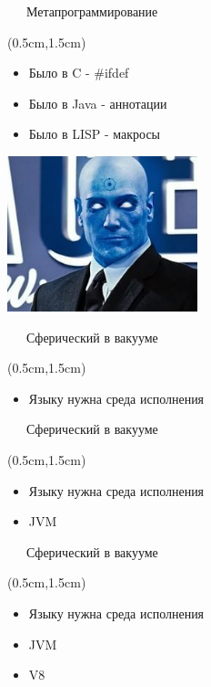 \documentclass[xetex,18pt,aspectratio=43]{beamer}
\begin{document}
\begin{Large}
\begin{frame}{\ \ \ Метапрограммирование}
\begin{textblock*}{\framewidth}(0.5cm,1.5cm)
\begin{itemize}
  \item Было в C - \#ifdef
  \item Было в Java - аннотации
  \item Было в LISP - макросы
\end{itemize}
\begin{minipage}{\textwidth}
  \centering
  \includegraphics[height=4.5cm]{img/megamind}
\end{minipage}
\end{textblock*}
\end{frame}

\begin{frame}{\ \ \ Сферический в вакууме}
\begin{textblock*}{\framewidth}(0.5cm,1.5cm)
\begin{itemize}
  \item Языку нужна среда исполнения
\end{itemize}
\end{textblock*}
\end{frame}

\begin{frame}{\ \ \ Сферический в вакууме}
\begin{textblock*}{\framewidth}(0.5cm,1.5cm)
\begin{itemize}
  \item Языку нужна среда исполнения
  \item JVM
\end{itemize}
\end{textblock*}
\end{frame}

\begin{frame}{\ \ \ Сферический в вакууме}
\begin{textblock*}{\framewidth}(0.5cm,1.5cm)
\begin{itemize}
  \item Языку нужна среда исполнения
  \item JVM
  \item V8
\end{itemize}
\end{textblock*}
\end{frame}


\end{Large}
\end{document}
